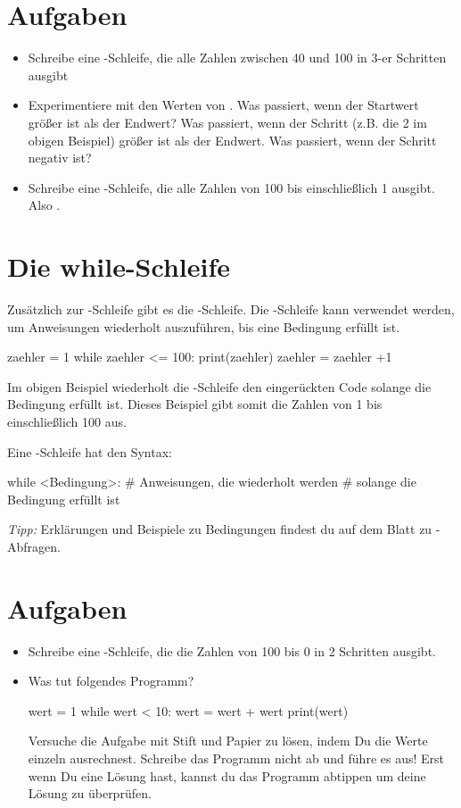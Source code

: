 \documentclass{\VorlagenPfad/coderdojokatext}
\begin{document}
\section{Aufgaben}
\begin{itemize}
	\item Schreibe eine -Schleife, die alle Zahlen zwischen 40 und 100 in 3-er Schritten ausgibt
	\item Experimentiere mit den Werten von . Was passiert, wenn der Startwert größer ist als der Endwert? Was passiert, wenn der Schritt (z.B. die 2 im obigen Beispiel) größer ist als der Endwert. Was passiert, wenn der Schritt negativ ist?
	\item Schreibe eine -Schleife, die alle Zahlen von 100 bis einschließlich 1 ausgibt. Also .
\end{itemize}

\section{Die while-Schleife} Zusätzlich zur -Schleife gibt es die -Schleife. Die -Schleife kann verwendet werden, um Anweisungen wiederholt auszuführen, bis eine Bedingung erfüllt ist.

\begin{pythoncode}
zaehler = 1
while zaehler <= 100:
	print(zaehler)
	zaehler = zaehler +1
\end{pythoncode}
Im obigen Beispiel wiederholt die -Schleife den eingerückten Code solange die Bedingung  erfüllt ist. Dieses Beispiel gibt somit die Zahlen von 1 bis einschließlich 100 aus.

\begin{merkbox}
Eine -Schleife hat den Syntax:
\begin{pythoncode}
while <Bedingung>:
	# Anweisungen, die wiederholt werden
	# solange die Bedingung erfüllt ist
\end{pythoncode}
\emph{Tipp:} Erklärungen und Beispiele zu Bedingungen findest du auf dem Blatt zu -Abfragen.
\end{merkbox}

\section{Aufgaben}
\begin{itemize}
	\item Schreibe eine -Schleife, die die Zahlen von 100 bis 0 in 2 Schritten ausgibt.
	\item
	
	Was tut folgendes Programm?
	\\
	
	\begin{pythoncode}
wert = 1
while wert < 10:
	wert = wert + wert
	print(wert)
	\end{pythoncode}
	Versuche die Aufgabe mit Stift und Papier zu lösen, indem Du die Werte einzeln ausrechnest. Schreibe das Programm nicht ab und führe es aus! Erst wenn Du eine Lösung hast, kannst du das Programm abtippen um deine Lösung zu überprüfen.
	
\end{itemize}
\end{document}
